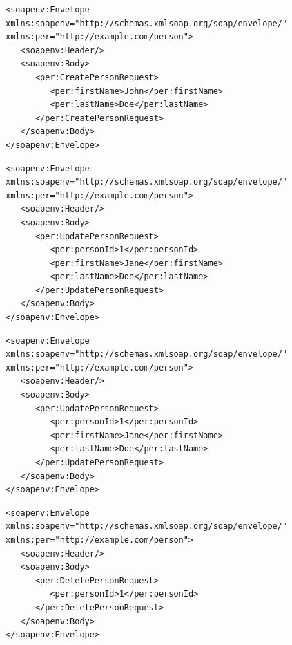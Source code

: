 \noindent\begin{minipage}{\textwidth}
\begin{lstlisting}[caption={SOAP create},captionpos=b,label={lst:s_create}]
<soapenv:Envelope xmlns:soapenv="http://schemas.xmlsoap.org/soap/envelope/" xmlns:per="http://example.com/person">
   <soapenv:Header/>
   <soapenv:Body>
      <per:CreatePersonRequest>
         <per:firstName>John</per:firstName>
         <per:lastName>Doe</per:lastName>
      </per:CreatePersonRequest>
   </soapenv:Body>
</soapenv:Envelope>
\end{lstlisting}
\end{minipage}
\noindent\begin{minipage}{\textwidth}
\begin{lstlisting}[caption={SOAP update},captionpos=b,label={lst:s_update}]
<soapenv:Envelope xmlns:soapenv="http://schemas.xmlsoap.org/soap/envelope/" xmlns:per="http://example.com/person">
   <soapenv:Header/>
   <soapenv:Body>
      <per:UpdatePersonRequest>
         <per:personId>1</per:personId>
         <per:firstName>Jane</per:firstName>
         <per:lastName>Doe</per:lastName>
      </per:UpdatePersonRequest>
   </soapenv:Body>
</soapenv:Envelope>
\end{lstlisting}
\end{minipage}
\noindent\begin{minipage}{\textwidth}
\begin{lstlisting}[caption={SOAP read },captionpos=b,label={lst:s_read}]
<soapenv:Envelope xmlns:soapenv="http://schemas.xmlsoap.org/soap/envelope/" xmlns:per="http://example.com/person">
   <soapenv:Header/>
   <soapenv:Body>
      <per:UpdatePersonRequest>
         <per:personId>1</per:personId>
         <per:firstName>Jane</per:firstName>
         <per:lastName>Doe</per:lastName>
      </per:UpdatePersonRequest>
   </soapenv:Body>
</soapenv:Envelope>
\end{lstlisting}
\end{minipage}
\noindent\begin{minipage}{\textwidth}
\begin{lstlisting}[caption={SOAP delete},captionpos=b,label={lst:s_delete}]
<soapenv:Envelope xmlns:soapenv="http://schemas.xmlsoap.org/soap/envelope/" xmlns:per="http://example.com/person">
   <soapenv:Header/>
   <soapenv:Body>
      <per:DeletePersonRequest>
         <per:personId>1</per:personId>
      </per:DeletePersonRequest>
   </soapenv:Body>
</soapenv:Envelope>
\end{lstlisting}
\end{minipage}

